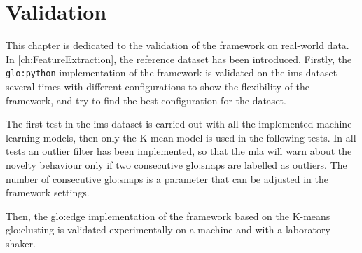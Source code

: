 \chapter{Validation}
\label{sec:Validation}

This chapter is dedicated to the validation of the framework on real-world data. In \autoref{ch:FeatureExtraction}, the reference dataset \cite{lee2007bearingdataset} has been introduced. Firstly, the \texttt{\gls{glo:python}} implementation of the framework is validated on the \gls{ims} dataset several times with different configurations to show the flexibility of the framework, and try to find the best configuration for the dataset. 

The first test in the \gls{ims} dataset is carried out with all the implemented machine learning models, then only the K-mean model is used in the following tests. In all tests an outlier filter has been implemented, so that the \gls{mla} will warn about the novelty behaviour only if two consecutive \gls{glo:snap}s are labelled as outliers. The number of consecutive \gls{glo:snap}s is a parameter that can be adjusted in the framework settings.

Then, the \gls{glo:edge} implementation of the framework based on the K-means \gls{glo:clust}ing is validated experimentally on a machine and with a laboratory shaker.









